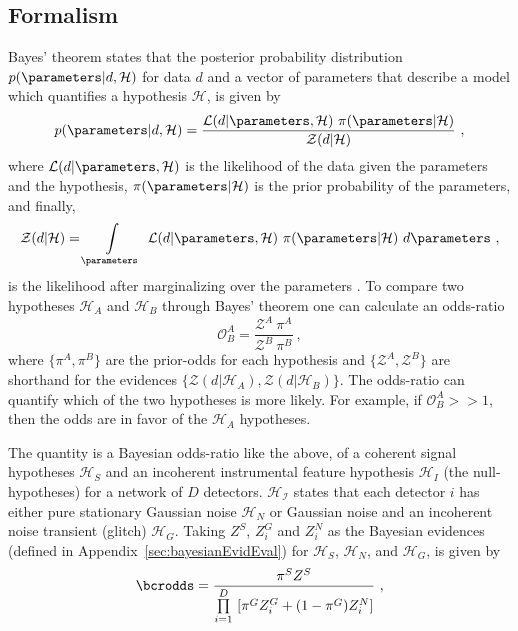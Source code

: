 
\subsection{Formalism}

Bayes' theorem states that the posterior probability distribution $p(\parameters|d,\mathcal{H})$ for data $d$ and a vector of parameters \parameters that describe a model which quantifies a hypothesis $\mathcal{H}$, is given by
\begin{equation}
p(\parameters|d,\mathcal{H}) = \frac{\mathcal{L}(d|\parameters, \mathcal{H}) \ \pi(\parameters | \mathcal{H})}{\mathcal{Z}(d|\mathcal{H})}\ , 
\end{equation}
where $\mathcal{L}(d|\parameters, \mathcal{H})$ is the likelihood of the data given the parameters \parameters and the hypothesis, $\pi(\parameters | \mathcal{H})$ is the prior probability of the parameters, and finally,
\begin{equation}
    \mathcal{Z}(d|\mathcal{H}) = \int\limits_{\parameters} \ \mathcal{L}(d|\parameters,\mathcal{H}) \ \pi(\parameters | \mathcal{H}) \ d\parameters\ ,
\end{equation} is the likelihood after marginalizing over the parameters \parameters.  To compare two hypotheses $\mathcal{H}_A$ and $\mathcal{H}_B$ through Bayes' theorem one can calculate an odds-ratio
\begin{equation}
    \mathcal{O}^A_B = \frac{\mathcal{Z}^A\ \pi^A}{\mathcal{Z}^B\ \pi^B}\ ,
\end{equation}
where  $\{\pi^A, \pi^B\}$ are the prior-odds for each hypothesis and $\{\mathcal{Z}^A, \mathcal{Z}^B\}$ are shorthand for the evidences $\{\mathcal{Z}(d|\mathcal{H}_A), \mathcal{Z}(d|\mathcal{H}_B)\}$. The odds-ratio can quantify which of the two hypotheses is more likely. For example, if $\mathcal{O}^A_B >> 1$, then the odds are in favor of the $\mathcal{H}_A$ hypotheses. 

The \bcrodds quantity is a Bayesian odds-ratio like the above, of a coherent signal hypotheses $\mathcal{H}_S$ and an incoherent instrumental feature hypothesis $\mathcal{H}_I$ (the null-hypotheses) for a network of $D$ detectors. $\mathcal{H_I}$ states that each detector $i$ has either pure stationary Gaussian noise $\mathcal{H}_N$ or Gaussian noise and an incoherent noise transient (glitch) $\mathcal{H}_G$. Taking $Z^S$, $Z^G_i$ and $Z^N_i$ as the Bayesian evidences (defined in Appendix~\ref{sec:bayesianEvidEval}) for $\mathcal{H}_S$, $\mathcal{H}_N$, and $\mathcal{H}_G$, \bcrodds is given by
\begin{equation}
\label{eq:origbcr}
\bcrodds = \frac{\pi^S Z^S}{\prod\limits^D_{i=1} \ [\pi^G Z^G_i + (1-\pi^G)Z^N_i]}\ ,
\end{equation}

